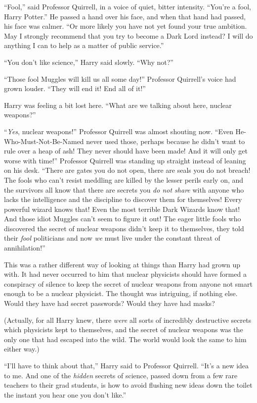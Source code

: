 “Fool,” said Professor Quirrell, in a voice of quiet, bitter intensity.
“You’re a fool, Harry Potter.” He passed a hand over his face, and when that hand had passed, his face was calmer.
“Or more likely you have not yet found your true ambition. May I strongly recommend that you try to become a Dark Lord instead? I will do anything I can to help as a matter of public service.”

“You don’t like science,” Harry said slowly.
“Why not?”

“Those fool Muggles will kill us all some day!” Professor Quirrell’s voice had grown louder.
“They will end it! End all of it!”

Harry was feeling a bit lost here.
“What are we talking about here, nuclear weapons?”

“\emph{Yes}, nuclear weapons!” Professor Quirrell was almost shouting now.
“Even He-Who-Must-Not-Be-Named never used those, perhaps because he didn’t want to rule over a heap of ash! They never should have been made! And it will only get worse with time!” Professor Quirrell was standing up straight instead of leaning on his desk.
“There are gates you do not open, there are seals you do not breach! The fools who can’t resist meddling are killed by the lesser perils early on, and the survivors all know that there are secrets you \emph{do not share} with anyone who lacks the intelligence and the discipline to discover them for themselves! Every powerful wizard knows that! Even the most terrible Dark Wizards know that! And those idiot Muggles can’t seem to figure it out! The eager little fools who discovered the secret of nuclear weapons didn’t keep it to themselves, they told their \emph{fool} politicians and now \emph{we} must live under the constant threat of annihilation!”

This was a rather different way of looking at things than Harry had grown up with. It had never occurred to him that nuclear physicists should have formed a conspiracy of silence to keep the secret of nuclear weapons from anyone not smart enough to be a nuclear physicist. The thought was intriguing, if nothing else. Would they have had secret passwords? Would they have had masks?

(Actually, for all Harry knew, there \emph{were} all sorts of incredibly destructive secrets which physicists kept to themselves, and the secret of nuclear weapons was the only one that had escaped into the wild. The world would look the same to him either way.)

“I’ll have to think about that,” Harry said to Professor Quirrell.
“It’s a new idea to me. And one of the \emph{hidden} secrets of science, passed down from a few rare teachers to their grad students, is how to avoid flushing new ideas down the toilet the instant you hear one you don’t like.”

